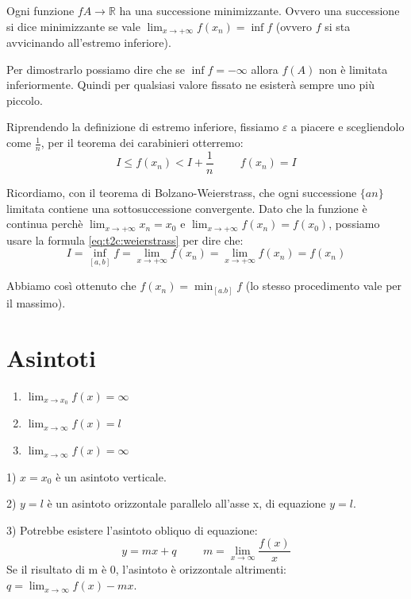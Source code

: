 \begin{osservation}
    Ogni funzione $fA\to\mathbb{R}$ ha una successione minimizzante. Ovvero una successione si dice minimizzante se vale $\lim_{x\to +\infty}f(x_n)=\inf{f}$ (ovvero $f$ si sta avvicinando all'estremo inferiore).
    
    \begin{dimostration}
        Per dimostrarlo possiamo dire che se $\inf{f}=-\infty$ allora $f(A)$ non è limitata inferiormente. Quindi per qualsiasi valore fissato ne esisterà sempre uno più piccolo.
        
        Riprendendo la definizione di estremo inferiore, fissiamo $\varepsilon$ a piacere e scegliendolo come $\frac{1}{n}$, per il teorema dei carabinieri otterremo:
        \begin{equation}\label{eq:t2c:weierstrass}
            I\leq f(x_n)<I+\frac{1}{n}\hspace{1cm}f(x_n)=I
        \end{equation}
        
        Ricordiamo, con il teorema di Bolzano-Weierstrass, che ogni successione $\{an\}$ limitata contiene una sottosuccessione convergente.
        Dato che la funzione è continua perchè $\lim_{x\to+\infty}x_n=x_0$ e $\lim_{x\to+\infty}f(x_n)=f(x_0)$, possiamo usare la formula \ref{eq:t2c:weierstrass} per dire che:
        \begin{equation*}
            I=\inf_{[a,b]}f=\lim_{x\to+\infty}f(x_n)=\lim_{x\to+\infty}f(x_n)=f(x_n)
        \end{equation*}
        
        Abbiamo così ottenuto che $f(x_n)=\min_{[a.b]}f$ (lo stesso procedimento vale per il massimo).\flushright{$\blacksquare$}
    \end{dimostration}
\end{osservation}

\section{Asintoti}
\begin{enumerate}
    \item $\lim_{x\to x_{0}} f(x)=\infty$
    \item $\lim_{x\to\infty} f(x)=l$
    \item $\lim_{x\to\infty} f(x)=\infty$
\end{enumerate}

1) $x=x_{0}$ è un asintoto verticale. 

2) $y=l$ è un asintoto orizzontale parallelo all'asse x, di equazione $y=l$.

3) Potrebbe esistere l'asintoto obliquo di equazione:
\begin{equation*}
    y=mx+q\hspace{1cm}m=\lim_{x\to\infty}\frac{f(x)}{x}  
\end{equation*}
Se il risultato di m è 0, l'asintoto è orizzontale altrimenti: $q=\lim_{x\to\infty}f(x)-mx$.
